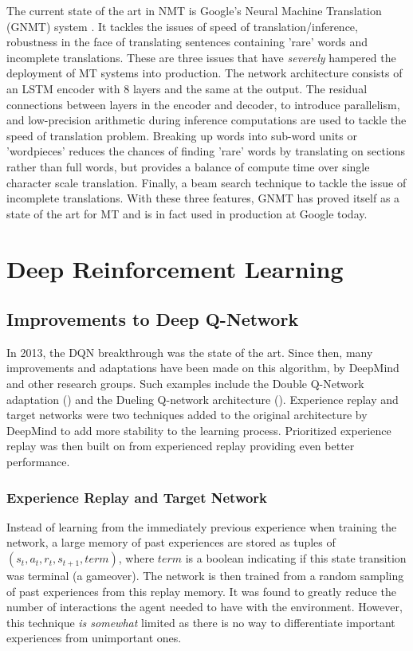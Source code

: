 The current state of the art in NMT is Google's Neural Machine Translation (GNMT) system \citet{wu2016google}. It tackles the issues of speed of translation/inference, robustness in the face of translating sentences containing 'rare' words and incomplete translations. These are three issues that have \textit{severely} hampered the deployment of MT systems into production. The network architecture consists of an LSTM encoder with 8 layers and the same at the output. The residual connections between layers in the encoder and decoder, to introduce parallelism, and low-precision arithmetic during inference computations are used to tackle the speed of translation problem. Breaking up words into sub-word units or 'wordpieces' reduces the chances of finding 'rare' words by translating on sections rather than full words, but provides a balance of compute time over single character scale translation. Finally, a beam search technique to tackle the issue of incomplete translations. With these three features, GNMT has proved itself as a state of the art for MT and is in fact used in production at Google today.

\section{Deep Reinforcement Learning}
\subsection{Improvements to Deep Q-Network}
In 2013, the DQN breakthrough was the state of the art. Since then, many improvements and adaptations have been made on this algorithm, by DeepMind and other research groups. Such examples include the Double Q-Network adaptation (\citet{doubleq}) and the Dueling Q-network architecture (\citet{dueling}). Experience replay and target networks were two techniques added to the original architecture by DeepMind to add more stability to the learning process. Prioritized experience replay was then built on from experienced replay providing even better performance.

\subsubsection{Experience Replay and Target Network} \label{sec:improvements}
Instead of learning from the immediately previous experience when training the network, a large memory of past experiences are stored as tuples of $(s_t, a_t, r_{t}, s_{t+1}, term)$, where $term$ is a boolean indicating if this state transition was terminal (a gameover). The network is then trained from a random sampling of past experiences from this replay memory. It was found to greatly reduce the number of interactions the agent needed to have with the environment. However, this technique \textit{is somewhat} limited as there is no way to differentiate important experiences from unimportant ones. \paragraph{}

